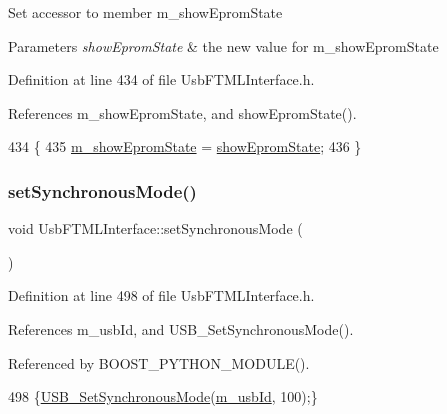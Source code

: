 Set accessor to member m\+\_\+show\+Eprom\+State 
\begin{DoxyParams}{Parameters}
{\em show\+Eprom\+State} & the new value for m\+\_\+show\+Eprom\+State \\
\hline
\end{DoxyParams}


Definition at line 434 of file Usb\+F\+T\+M\+L\+Interface.\+h.



References m\+\_\+show\+Eprom\+State, and show\+Eprom\+State().


\begin{DoxyCode}
434                                                \{
435     \hyperlink{classUsbFTMLInterface_ac9505aba2e8a9fd9de9aed880a56a650}{m\_showEpromState} = \hyperlink{classUsbFTMLInterface_aa62fc0edc39360eeb473fe9e91df9044}{showEpromState};
436   \}
\end{DoxyCode}
\mbox{\label{classUsbFTMLInterface_a8aa032fbbaf9d0adbeea2d147d7c8a14}} 
\subsubsection{\texorpdfstring{set\+Synchronous\+Mode()}{setSynchronousMode()}}
{\footnotesize\ttfamily void Usb\+F\+T\+M\+L\+Interface\+::set\+Synchronous\+Mode (\begin{DoxyParamCaption}{ }\end{DoxyParamCaption})\hspace{0.3cm}{\ttfamily [inline]}}



Definition at line 498 of file Usb\+F\+T\+M\+L\+Interface.\+h.



References m\+\_\+usb\+Id, and U\+S\+B\+\_\+\+Set\+Synchronous\+Mode().



Referenced by B\+O\+O\+S\+T\+\_\+\+P\+Y\+T\+H\+O\+N\+\_\+\+M\+O\+D\+U\+L\+E().


\begin{DoxyCode}
498 \{\hyperlink{LALUsbML_8h_a33d11c5713bc41165b004b1ed3a1b408}{USB\_SetSynchronousMode}(\hyperlink{classUsbFTMLInterface_aab6754587c303660d5c498ce34a2b4c8}{m\_usbId}, 100);\}
\end{DoxyCode}
\mbox{\label{classUsbFTMLInterface_a93f8a5e14d22d36e29ffa367d60faca5}} 
